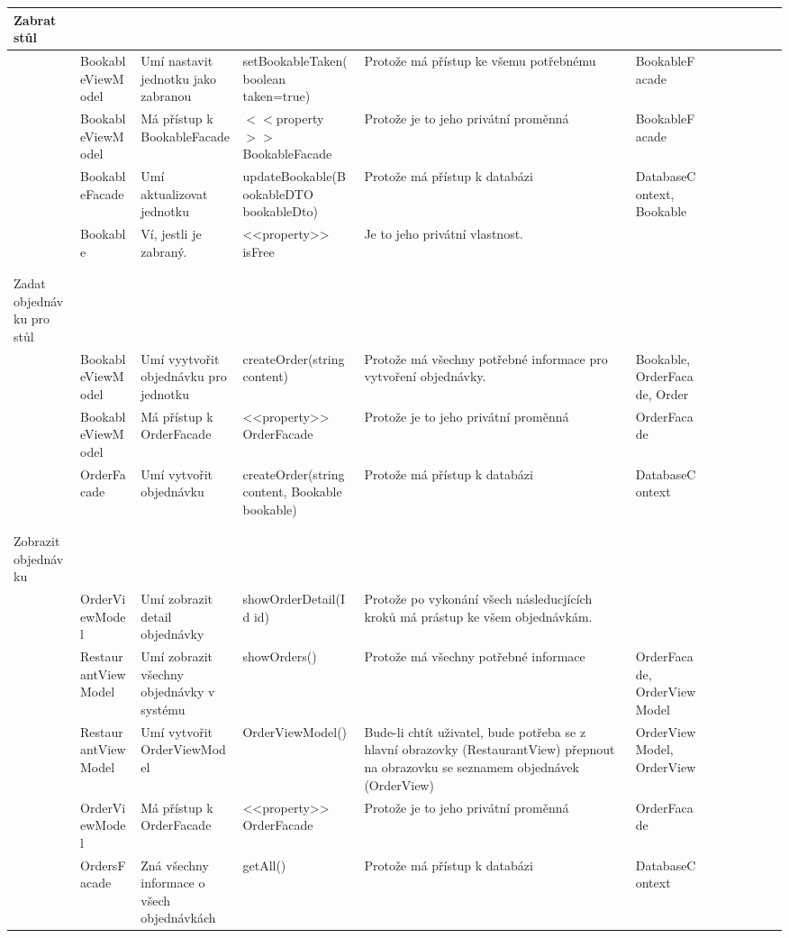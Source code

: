 \begin{landscape}
\begin{longtable}{ Lp{2cm} | Lp{3.5cm} | Lp{3cm} | Lp{4cm} | Lp{4cm} | Lp{4cm} }
    Zabrat stůl & & & & & \\
    \hline
    & BookableViewModel & Umí nastavit jednotku jako zabranou & setBookableTaken(boolean taken=true) & Protože má přístup ke všemu potřebnému & BookableFacade\\
    & BookableViewModel & Má přístup k BookableFacade & $<<$property$>>$ BookableFacade & Protože je to jeho privátní proměnná & BookableFacade \\
    & BookableFacade & Umí aktualizovat jednotku & updateBookable(BookableDTO bookableDto) & Protože má přístup k databázi & DatabaseContext, Bookable\\
    & Bookable & Ví, jestli je zabraný. & <<property>> isFree & Je to jeho privátní vlastnost. & \\
    & & & & & \\
    & & & & & \\
    
    Zadat objednávku pro stůl & & & & & \\
    \hline
    & BookableViewModel & Umí vyytvořit objednávku pro jednotku & createOrder(string content) & Protože má všechny potřebné informace pro vytvoření objednávky. & Bookable, OrderFacade, Order \\
    & BookableViewModel & Má přístup k OrderFacade & <<property>> OrderFacade & Protože je to jeho privátní proměnná & OrderFacade \\
    & OrderFacade & Umí vytvořit objednávku & createOrder(string content, Bookable bookable) & Protože má přístup k databázi & DatabaseContext \\
    & & & & & \\
    & & & & & \\
    
    Zobrazit objednávku & & & & & \\
    \hline
    & OrderViewModel & Umí zobrazit detail objednávky & showOrderDetail(Id id) & Protože po vykonání všech následucjících kroků má prástup ke všem objednávkám. & \\
    & RestaurantViewModel & Umí zobrazit všechny objednávky v systému & showOrders() & Protože má všechny potřebné informace & OrderFacade, OrderViewModel \\
    & RestaurantViewModel & Umí vytvořit OrderViewModel & OrderViewModel() & Bude-li chtít uživatel, bude potřeba se z hlavní obrazovky (RestaurantView) přepnout na obrazovku se seznamem objednávek (OrderView) & OrderViewModel, OrderView \\
    & OrderViewModel & Má přístup k OrderFacade & <<property>> OrderFacade & Protože je to jeho privátní proměnná & OrderFacade \\
    & OrdersFacade & Zná všechny informace o všech objednávkách & getAll() & Protože má přístup k databázi & DatabaseContext\\
    

\end{longtable}
\end{landscape}
